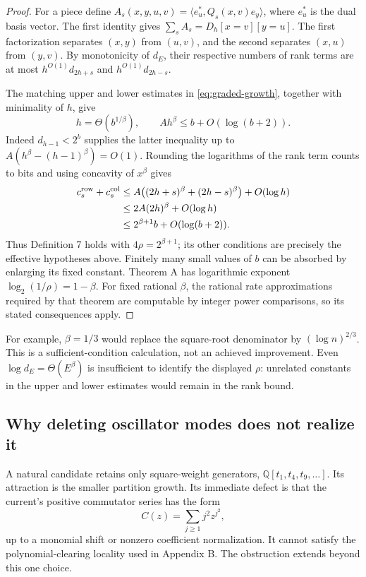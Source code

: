 \begin{proof}
For a piece define
$A_s(x,y,u,v)=\langle e_u^*,Q_s(x,v)e_y\rangle$, where $e_u^*$ is
the dual basis vector.
The first identity gives
$\sum_s A_s=D_h[x=v][y=u]$.
The first factorization separates $(x,y)$ from $(u,v)$, and the
second separates $(x,u)$ from $(y,v)$.  By monotonicity of $d_E$,
their respective numbers of rank terms are at most
$h^{O(1)}d_{2h+s}$ and $h^{O(1)}d_{2h-s}$.

The matching upper and lower estimates in \eqref{eq:graded-growth},
together with minimality of $h$, give
\[
 h=\Theta(b^{1/\beta}),\qquad
 A h^\beta\le b+O(\log(b+2)).
\]
Indeed $d_{h-1}<2^b$ supplies the latter inequality up to
$A(h^\beta-(h-1)^\beta)=O(1)$.  Rounding the logarithms of the
rank term counts to bits and using concavity of $x^\beta$ gives
\begin{align*}
 c_s^{\rm row}+c_s^{\rm col}
 &\le A\bigl((2h+s)^\beta+(2h-s)^\beta\bigr)+O(\log h)\\
 &\le 2A(2h)^\beta+O(\log h)\\
 &\le 2^{\beta+1}b+O(\log(b+2)).
\end{align*}
Thus Definition 7 holds with $4\rho=2^{\beta+1}$; its other
conditions are precisely the effective hypotheses above.  Finitely
many small values of $b$ can be absorbed by enlarging its fixed
constant.  Theorem A has logarithmic exponent
$\log_2(1/\rho)=1-\beta$.  For fixed rational $\beta$, the rational
rate approximations required by that theorem are computable by integer
power comparisons, so its stated consequences apply.
\end{proof}

For example, $\beta=1/3$ would replace the square-root denominator by
$(\log n)^{2/3}$.  This is a sufficient-condition calculation, not an
achieved improvement.  Even $\log d_E=\Theta(E^\beta)$ is insufficient
to identify the displayed $\rho$: unrelated constants in the upper
and lower estimates would remain in the rank bound.

\subsection{Why deleting oscillator modes does not realize it}

A natural candidate retains only square-weight generators,
$\mathbb Q[t_1,t_4,t_9,\ldots]$.  Its attraction is the smaller
partition growth.  Its immediate defect is that the current's positive
commutator series has the form
\begin{equation}
 C(z)=\sum_{j\ge1}j^2z^{j^2},
 \label{eq:square-current}
\end{equation}
up to a monomial shift or nonzero coefficient normalization.
It cannot satisfy the polynomial-clearing locality used in Appendix B.
The obstruction extends beyond this one choice.

